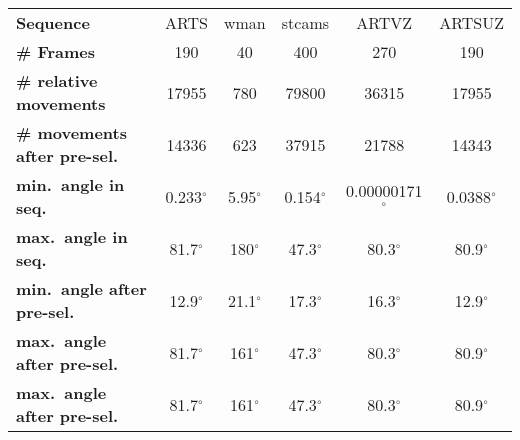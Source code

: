 %
%
\begin{tabular}{l|ccc|cc}
\hline
\hline
                  \textbf{Sequence} &          ARTS &           wman &         stcams &         ARTVZ &        ARTSUZ \\ 
                 \textbf{\# Frames} &             190 &              40 &             400 &             270 &             190 \\ 
     \textbf{\# relative movements} &           17955 &             780 &           79800 &           36315 &           17955 \\ 
\textbf{\# movements after pre-sel.} &           14336 &             623 &           37915 &           21788 &           14343 \\ 
       \textbf{min.\ angle in seq.} &   0.233$^\circ$ &    5.95$^\circ$ &   0.154$^\circ$ & 0.00000171$^\circ$ &  0.0388$^\circ$ \\ 
       \textbf{max.\ angle in seq.} &    81.7$^\circ$ &     180$^\circ$ &    47.3$^\circ$ &    80.3$^\circ$ &    80.9$^\circ$ \\ 
\textbf{min.\ angle after pre-sel.} &    12.9$^\circ$ &    21.1$^\circ$ &    17.3$^\circ$ &    16.3$^\circ$ &    12.9$^\circ$ \\ 
\textbf{max.\ angle after pre-sel.} &    81.7$^\circ$ &     161$^\circ$ &    47.3$^\circ$ &    80.3$^\circ$ &    80.9$^\circ$ \\ \hline\hline
\textbf{max.\ angle after pre-sel.} &    81.7$^\circ$ &     161$^\circ$ &    47.3$^\circ$ &    80.3$^\circ$ &    80.9$^\circ$ \\ \hline\hline
\end{tabular}
